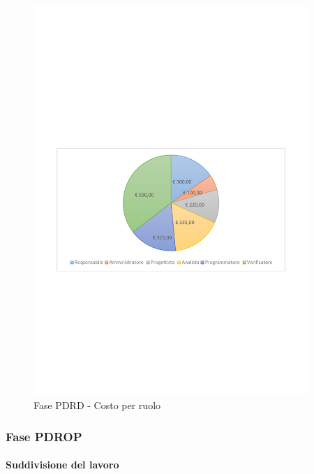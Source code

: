 \documentclass[../PianoProgetto.tex]{subfiles}
\begin{document}
	\begin{figure}[!h]
		\centering
		\includegraphics[width=0.93\textwidth , trim=2cm 9.5cm 2cm 11cm]{grafici/PDRD/PDRD-costo}
			\caption{Fase PDRD - Costo per ruolo}
		\label{fig:CircleChart-fasePDRD_costo_r}
	\end{figure}
\vfill
	
	\subsubsection{Fase PDROP}
				\paragraph{Suddivisione del lavoro}
						
\end{document}

